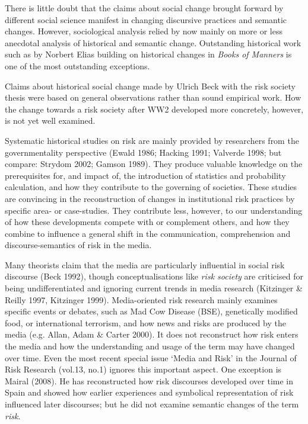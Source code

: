 \documentclass{report}
\begin{document}
There is little doubt that the claims about social change brought forward by different social science manifest in changing discursive practices and semantic changes. However, sociological analysis relied by now mainly on more or less anecdotal analysis of historical and semantic change. Outstanding historical work such as by Norbert Elias building on historical changes in \emph{Books of Manners} is one of the most outstanding exceptions. 

Claims about historical social change made by Ulrich Beck with the risk society thesis were based on general observations rather than sound empirical work. How the change towards a risk society after WW2 developed more concretely, however, is not yet well examined.

Systematic historical studies on risk are mainly provided by researchers from the governmentality perspective (Ewald 1986; Hacking 1991; Valverde 1998; but compare: Strydom 2002; Gamson 1989). They produce valuable knowledge on the prerequisites for, and impact of, the introduction of statistics and probability calculation, and how they contribute to the governing of societies. These studies are convincing in the reconstruction of changes in institutional risk practices by specific area- or case-studies. They contribute less, however, to our understanding of how these developments compete with or complement others, and how they combine to influence a general shift in the communication, comprehension and discourse-semantics of risk in the media. 

Many theorists claim that the media are particularly influential in social risk discourse (Beck 1992), though conceptualisations like \emph{risk society} are criticised for being undifferentiated and ignoring current trends in media research (Kitzinger \& Reilly 1997, Kitzinger 1999). Media-oriented risk research mainly examines specific events or debates, such as Mad Cow Disease (BSE), genetically modified food, or international terrorism, and how news and risks are produced by the media (e.g. Allan, Adam \& Carter 2000). It does not reconstruct how risk enters the media and how the understanding and usage of the term may have changed over time. Even the most recent special issue `Media and Risk' in the Journal of Risk Research (vol.13, no.1) ignores this important aspect. One exception is Mairal (2008). He has reconstructed how risk discourses developed over time in Spain and showed how earlier experiences and symbolical representation of risk influenced later discourses; but he did not examine semantic changes of the term \emph{risk}. 
\end{document}
